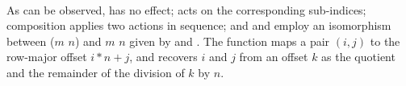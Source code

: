 \begin{code}
\AgdaSpace{}%
\AgdaSymbol{)}\<%
\\
%
\>[2]\AgdaSpace{}%
\AgdaSpace{}%
%
\>[14]%
\>[17]\AgdaSymbol{=}\AgdaSpace{}%
\AgdaSpace{}%
\AgdaSpace{}%
\AgdaOperator{\AgdaInductiveConstructor{,}}\AgdaSpace{}%
\AgdaSpace{}%
\AgdaSymbol{=}\AgdaSpace{}%
\AgdaSpace{}%
\AgdaSymbol{\AgdaUnderscore{}}\AgdaSpace{}%
\AgdaSymbol{(}\AgdaSpace{}%
\AgdaSymbol{)}\AgdaSpace{}%
\AgdaSpace{}%
\AgdaSpace{}%
\AgdaSpace{}%
\AgdaSpace{}%
\AgdaSpace{}%
\<%
\end{code}
As can be observed,  has no effect;  acts on the corresponding
sub-indices; composition  applies two actions in sequence; and
 and  employ an isomorphism between ($m$ \AF{*} $n$)
and  $m$   $n$ given by  and .
The function  maps a pair $(i, j)$ to the row-major offset
$i * n + j$, and  recovers $i$ and $j$ from an offset $k$ as the
quotient and the remainder of the division of $k$ by $n$.

